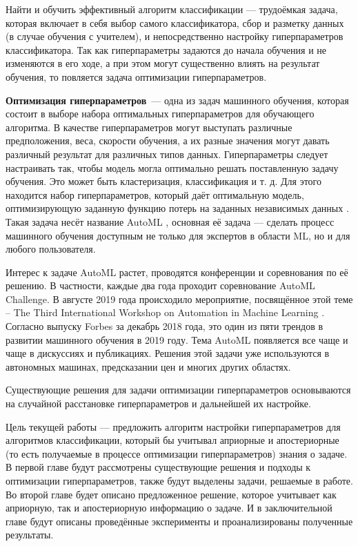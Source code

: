 \documentclass[times,specification,annotation]{itmo-student-thesis}
\begin{document}
	Найти и обучить эффективный алгоритм классификации --- трудоёмкая задача, которая включает в себя выбор самого классификатора, сбор и разметку данных (в случае обучения с учителем), и непосредственно настройку гиперпараметров классификатора. Так как гиперпараметры задаются до начала обучения и не изменяются в его ходе, а при этом могут существенно влиять на результат обучения, то повляется задача оптимизации гиперпараметров. \par
	

	\textbf{Оптимизация гиперпараметров} --- одна из задач машинного обучения, которая состоит в выборе набора оптимальных гиперпараметров для обучающего алгоритма. В качестве гиперпараметров могут выступать различные предположения, веса, скорости обучения, а их разные значения могут давать различный результат для различных типов данных. Гиперпараметры следует настраивать так, чтобы модель могла оптимально решать поставленную задачу обучения. Это может быть кластеризация, классификация и т. д. Для этого находится набор гиперпараметров, который даёт оптимальную модель, оптимизирующую заданную функцию потерь на заданных независимых данных \cite{claesen2015hyperparameter}. Такая задача несёт название AutoML \cite{feurer-automlbook19a}, основная её задача --- сделать процесс машинного обучения доступным не только для экспертов в области ML, но и для любого пользователя. 
	
	Интерес к задаче AutoML растет, проводятся конференции и соревнования по её решению. В частности, каждые два года проходит соревнование AutoML Challenge. В августе 2019 года происходило мероприятие, посвящённое этой теме -- The Third International Workshop on Automation in Machine Learning \cite{10.1145/3401071}. Согласно выпуску Forbes за декабрь 2018 года, это один из пяти трендов в развитии машинного обучения в 2019 году. Тема AutoML появляется все чаще и чаще в дискуссиях и публикациях. Решения этой задачи уже используются в автономных машинах, предсказании цен и многих других областях.
	
	Существующие решения \cite{lindauer2017warmstarting, HutHooLey10-TR, NIPS2015_5872, falkner-icml-18} для задачи оптимизации гиперпараметров основываются на случайной расстановке гиперпараметров и дальнейшей их настройке. 
	\par
	
	 Цель текущей работы --- предложить алгоритм настройки гиперпараметров для алгоритмов классификации, который бы учитывал априорные и апостериорные (то есть получаемые в процессе оптимизации гиперпараметров) знания о задаче. В первой главе будут рассмотрены существующие решения и подходы к оптимизации гиперпараметров, также будут выделены задачи, решаемые в работе. Во второй главе будет описано предложенное решение, которое учитывает как априорную, так и апостериорную информацию о задаче. И в заключительной главе будут описаны проведённые эксперименты и проанализированы полученные результаты. 
	 \par
\end{document}
